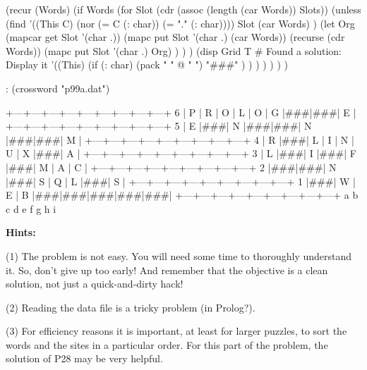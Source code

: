 \begin{wideverbatim}


      (recur (Words)
         (if Words
            (for Slot (cdr (assoc (length (car Words)) Slots))
               (unless
                  (find
                     '((This C) (nor (= C (: char)) (= "." (: char))))
                     Slot
                     (car Words) )
                  (let Org (mapcar get Slot '(char .))
                     (mapc put Slot '(char .) (car Words))
                     (recurse (cdr Words))
                     (mapc put Slot '(char .) Org) ) ) )
            (disp Grid T  # Found a solution: Display it
               '((This)
                  (if (: char)
                     (pack " " @ " ")
                     "###" ) ) ) ) ) ) )

: (crossword "p99a.dat")

   +---+---+---+---+---+---+---+---+---+
 6 | P | R | O | L | O | G |###|###| E |
   +---+---+---+---+---+---+---+---+---+
 5 | E |###| N |###|###| N |###|###| M |
   +---+---+---+---+---+---+---+---+---+
 4 | R |###| L | I | N | U | X |###| A |
   +---+---+---+---+---+---+---+---+---+
 3 | L |###| I |###| F |###| M | A | C |
   +---+---+---+---+---+---+---+---+---+
 2 |###|###| N |###| S | Q | L |###| S |
   +---+---+---+---+---+---+---+---+---+
 1 |###| W | E | B |###|###|###|###|###|
   +---+---+---+---+---+---+---+---+---+
     a   b   c   d   e   f   g   h   i

\end{wideverbatim}


\pagebreak{}
 \textbf{Hints:}

 (1) The problem is not easy. You will need some time to thoroughly
 understand it. So, don't give up too early! And remember that the
 objective is a clean solution, not just a quick-and-dirty hack!

 (2) Reading the data file is a tricky problem (in Prolog?).

 (3) For efficiency reasons it is important, at least for larger
 puzzles, to sort the words and the sites in a particular order. For
 this part of the problem, the solution of P28 may be very helpful.

